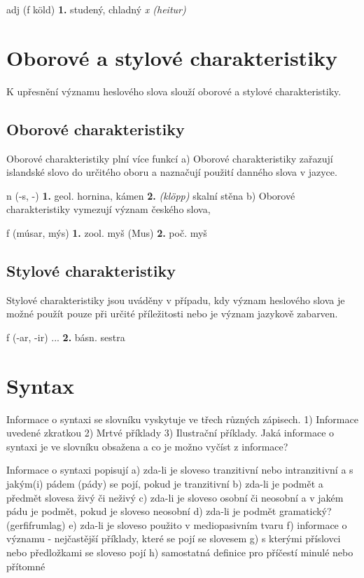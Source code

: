  {\small{ adj (f köld) }
\textbf{1.} {studený, chladný} \textit{x (heitur)}}

\section{Oborové a stylové charakteristiky}
K upřesnění významu heslového slova slouží oborové a stylové charakteristiky.

\subsection{Oborové charakteristiky}
Oborové charakteristiky plní více funkcí
a) Oborové charakteristiky zařazují islandské slovo do určitého oboru a naznačují použití danného slova v jazyce.

 {\small{n (-s, -)}
\textbf{1.} \footnotesize{ geol. } {hornina, kámen} 
\textbf{2. } \textit{(klöpp)} { skalní stěna } }
b) Oborové charakteristiky vymezují význam českého slova,

 {\small{ f (músar, mýs)}
\textbf{1.} \footnotesize{ zool.} { myš } (Mus)
\textbf{2.} \footnotesize{ poč.} { myš } }

\subsection{Stylové charakteristiky}
Stylové charakteristiky jsou uváděny v případu, kdy význam heslového slova je možné použít pouze při určité příležitosti nebo je význam jazykově zabarven.

 {\small{ f (-ar, -ir) }
...
\textbf{2.} \footnotesize{básn.} {sestra} }

\section{Syntax}
Informace o syntaxi se slovníku vyskytuje ve třech různých zápisech. 1) Informace uvedené zkratkou 2) Mrtvé příklady 3) Ilustrační příklady. 
Jaká informace o syntaxi je ve slovníku obsažena a co je možno vyčíst z informace?

Informace o syntaxi popisují
a) zda-li je sloveso tranzitivní nebo intranzitivní a s jakým(i) pádem (pády) se pojí, pokud je tranzitivní
b) zda-li je podmět a předmět slovesa živý či neživý
c) zda-li je sloveso osobní či neosobní a v jakém pádu je podmět, pokud je sloveso neosobní
d) zda-li je podmět gramatický? (gerfifrumlag)
e) zda-li je sloveso použito v mediopasivním tvaru
f) informace o významu - nejčastější příklady, které se pojí se slovesem
g) s kterými příslovci nebo předložkami se sloveso pojí
h) samostatná definice pro příčestí minulé nebo přítomné
